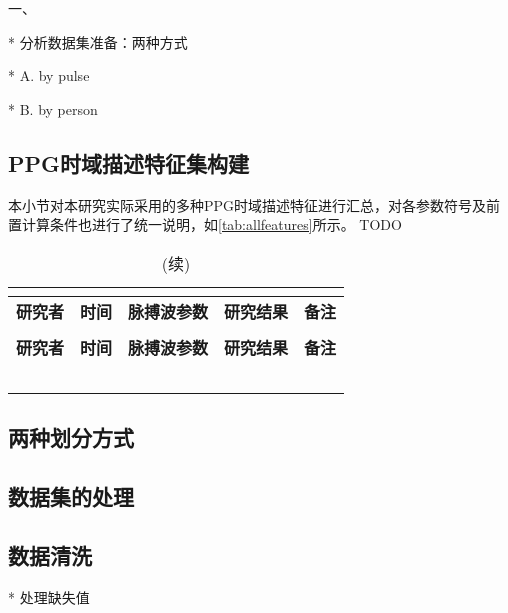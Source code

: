 一、

* 分析数据集准备：两种方式

  * A. by pulse

  * B. by person
\subsection{PPG时域描述特征集构建}

本小节对本研究实际采用的多种PPG时域描述特征进行汇总，对各参数符号及前置计算条件也进行了统一说明，如\autoref{tab:allfeatures}所示。
TODO
\begin{center}
    \fontsize{10}{4}
    \begin{longtable}{p{3cm}<{\centering}p{1cm}<{\centering}p{2cm}<{\centering}p{6cm}<{\centering}p{1cm}<{\centering}}
        \caption{本研究使用的所有PPG时域指标一览}\\
        \label{tab:allfeatures}\\
        \hline\hline
            \textbf{研究者}&\textbf{时间}&\textbf{脉搏波参数}&\textbf{研究结果}&\textbf{备注}\\
        \hline
        \endfirsthead
        \caption[]{(续)}\\
        \hline
            \textbf{研究者}&\textbf{时间}&\textbf{脉搏波参数}&\textbf{研究结果}&\textbf{备注}\\
        \hline
        \endhead 
        \hline
        \endfoot
        \hline\hline
        \endlastfoot
        &       &       &       &  \\
        &       &       &       &  \\
        &       &       &       &  \\
        &       &       &       &  \\
        &       &       &       &  \\
    \end{longtable}
\end{center}
\subsection{两种划分方式}
\subsection{数据集的处理}

\subsection{数据清洗}
* 处理缺失值


